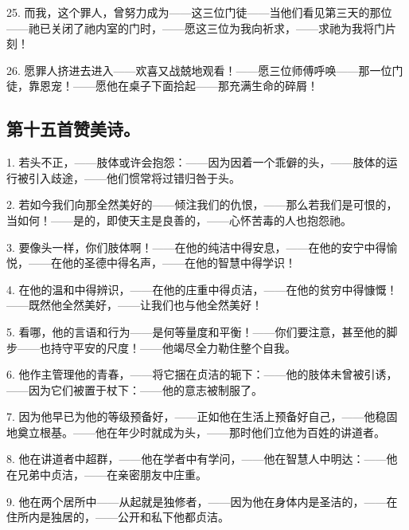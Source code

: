 25. 而我，这个罪人，曾努力成为——这三位门徒——当他们看见第三天的那位——祂已关闭了祂内室的门时，——愿这三位为我向祈求，——求祂为我将门片刻！\par

26. 愿罪人挤进去进入——欢喜又战兢地观看！——愿三位师傅呼唤——那一位门徒，靠恩宠！——愿他在桌子下面拾起——那充满生命的碎屑！\par


\subsection{第十五首赞美诗。}

1. 若头不正，——肢体或许会抱怨：——因为因着一个乖僻的头，——肢体的运行被引入歧途，——他们惯常将过错归咎于头。\par

2. 若如今我们向那全然美好的——倾注我们的仇恨，——那么若我们是可恨的，当如何！——是的，即使天主是良善的，——心怀苦毒的人也抱怨祂。\par

3. 要像头一样，你们肢体啊！——在他的纯洁中得安息，——在他的安宁中得愉悦，——在他的圣德中得名声，——在他的智慧中得学识！\par

4. 在他的温和中得辨识，——在他的庄重中得贞洁，——在他的贫穷中得慷慨！——既然他全然美好，——让我们也与他全然美好！\par

5. 看哪，他的言语和行为——是何等量度和平衡！——你们要注意，甚至他的脚步——也持守平安的尺度！——他竭尽全力勒住整个自我。\par

6. 他作主管理他的青春，——将它捆在贞洁的轭下：——他的肢体未曾被引诱，——因为它们被置于杖下：——他的意志被制服了。\par

7. 因为他早已为他的等级预备好，——正如他在生活上预备好自己，——他稳固地奠立根基。——他在年少时就成为头，——那时他们立他为百姓的讲道者。\par

8. 他在讲道者中超群，——他在学者中有学问，——他在智慧人中明达：——他在兄弟中贞洁，——在亲密朋友中庄重。\par

9. 他在两个居所中——从起就是独修者，——因为他在身体内是圣洁的，——在住所内是独居的，——公开和私下他都贞洁。\par


